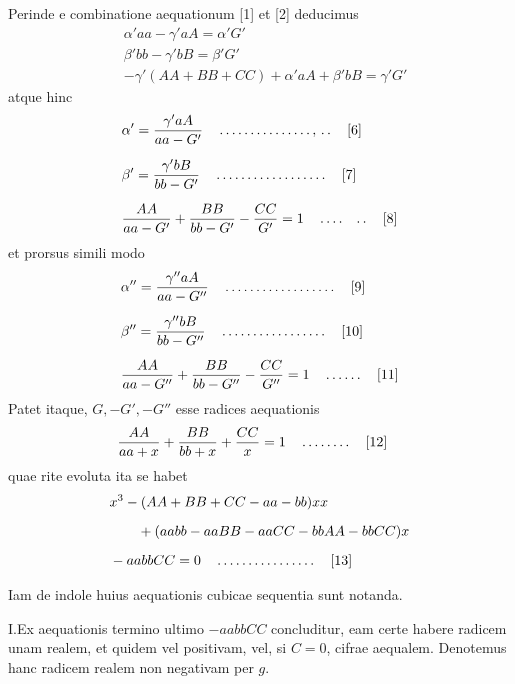 Perinde e combinatione aequationum [1] et [2] deducimus
\[
\begin{aligned}
&\alpha'aa-\gamma'aA=\alpha'G'\\[6pt]
&\beta'bb-\gamma'bB=\beta'G'\\[6pt]
&-\gamma'(AA+BB+CC)+\alpha'aA+\beta'bB=\gamma'G'
\end{aligned}
\]
atque hinc
\[
\begin{aligned}
&\alpha'{}=\frac{\gamma'aA}{aa-G'}\quad\mathinner{.\,.\,.\,.\,.\,.\,.\,.\,.\,.\,.\,.\,.\,.\,.\,,\,.\,.}\quad\text{[6]}\\[6pt]
&\beta'{}=\frac{\gamma'bB}{bb-G'}\quad\mathinner{.\,.\,.\,.\,.\,.\,.\,.\,.\,.\,.\,.\,.\,.\,.\,.\,.\,.}\quad\text{[7]}\\[6pt]
&\frac{AA}{aa-G'}+\frac{BB}{bb-G'}-\frac{CC}{G'}=1\quad\mathinner{.\,.\,.\,.\quad.\,.}\quad\text{[8]}
\end{aligned}
\]
et prorsus simili modo
\[
\begin{aligned}
&\alpha''{}=\frac{\gamma''aA}{aa-G''}\quad\mathinner{.\,.\,.\,.\,.\,.\,.\,.\,.\,.\,.\,.\,.\,.\,.\,.\,.\,.}\quad\text{[9]}\\[6pt]
&\beta''{}=\frac{\gamma''bB}{bb-G''}\quad\mathinner{.\,.\,.\,.\,.\,.\,.\,.\,.\,.\,.\,.\,.\,.\,.\,.\,.}\quad\text{[10]}\\[6pt]
&\frac{AA}{aa-G''}+\frac{BB}{bb-G''}-\frac{CC}{G''}=1\quad\mathinner{.\,.\,.\,.\,.\,.}\quad\text{[11]}
\end{aligned}
\]
Patet itaque, $G,-G',-G''$ esse radices aequationis
\[
\begin{aligned}
&\frac{AA}{aa+x}+\frac{BB}{bb+x}+\frac{CC}{x}=1\quad\mathinner{.\,.\,.\,.\,.\,.\,.\,.}\quad\text{[12]}
\end{aligned}
\]
quae rite evoluta ita se habet
\[
\begin{aligned}
&x^3-(AA+BB+CC-aa-bb)xx\\[6pt]
&\qquad{}+(aabb-aaBB-aaCC-bbAA-bbCC)x\\[6pt]
&-aabbCC=0\quad\mathinner{.\,.\,.\,.\,.\,.\,.\,.\,.\,.\,.\,.\,.\,.\,.\,.}\quad\text{[13]}
\end{aligned}
\]


Iam de indole huius aequationis cubicae sequentia sunt notanda.

I.\quad Ex aequationis termino ultimo \(-aabbCC\) concluditur, eam certe habere radicem unam realem, et quidem vel positivam, vel, si \(C=0\), cifrae aequalem. Denotemus hanc radicem realem non negativam per \(g\).

